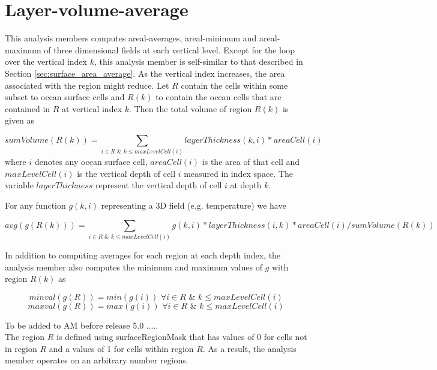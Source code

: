 \section{Layer-volume-average}
\label{sec:layer_volume_average}

This analysis members computes areal-averages, areal-minimum and areal-maximum of three dimensional fields at each vertical level. Except for the loop over the vertical index $k$, this analysis member is self-similar to that described in Section \ref{sec:surface_area_average}. As the vertical index increases, the area associated with the region might reduce. Let $R$ contain the cells within some subset to ocean surface cells and $R(k)$ to contain the ocean cells that are contained in $R$ at vertical index $k$. Then the total volume of region $R(k)$ is given as

\begin{equation}
sumVolume(R(k)) = \sum_{i \in R \,\, \& \,\, k \le maxLevelCell(i)} layerThickness(k,i) * areaCell(i)
\end{equation}
where $i$ denotes any ocean surface cell, $areaCell(i)$ is the area of that cell and $maxLevelCell(i)$ is the vertical depth of cell $i$ measured in index space. The variable $layerThickness$ represent the vertical depth of cell $i$ at depth $k$.

For any function $g(k,i)$ representing a 3D field (e.g. temperature) we have

\begin{equation}
avg(g(R(k))) = \sum_{i \in R \,\, \& \,\, k \le maxLevelCell(i)} g(k,i)*layerThickness(i,k)*areaCell(i) / sumVolume(R(k))
\end{equation}

In addition to computing averages for each region at each depth index, the analysis member also computes the minimum and maximum values of $g$ with region $R(k)$ as

\begin{equation}
minval(g(R))=min(g(i)) \, \, \forall i \in R \,\, \& \,\, k \le maxLevelCell(i)
\end{equation}
\begin{equation}
maxval(g(R))=max(g(i)) \, \, \forall i \in R \,\, \& \,\, k \le maxLevelCell(i)
\end{equation}

{\noindent}To be added to AM before release 5.0 .....\\
The region $R$ is defined using surfaceRegionMask that has values of 0 for cells not in region $R$ and a values of 1 for cells within region $R$. As a result, the analysis member operates on an arbitrary number regions.

